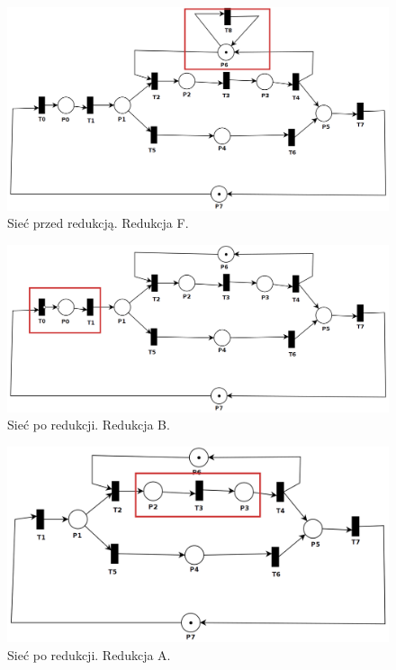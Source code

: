 \documentclass[12pt]{article}
\begin{document}
\vspace{-0.5cm}

\begin{figure}[H]
    \centering
    \includegraphics[width=\linewidth]{../../lab8/ex_2_1}
    \caption{Sieć przed redukcją. Redukcja F.}
\end{figure}

\begin{figure}[H]
    \centering
    \includegraphics[width=\linewidth]{../../lab8/ex_2_2}
    \caption{Sieć po redukcji. Redukcja B.}
\end{figure}

\begin{figure}[H]
    \centering
    \includegraphics[width=\linewidth]{../../lab8/ex_2_3}
    \caption{Sieć po redukcji. Redukcja A.}
\end{figure}
\end{document}
